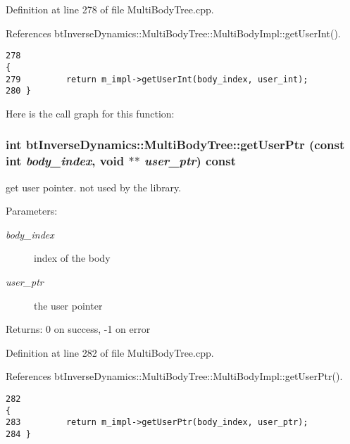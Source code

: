 Definition at line 278 of file MultiBodyTree.cpp.

References btInverseDynamics::MultiBodyTree::MultiBodyImpl::getUserInt().

\begin{Code}\begin{verbatim}278                                                                        {
279         return m_impl->getUserInt(body_index, user_int);
280 }
\end{verbatim}
\end{Code}




Here is the call graph for this function:\hypertarget{classbt_inverse_dynamics_1_1_multi_body_tree_32df6e169921b17d1bce944dc83918e9}{
\subsubsection[getUserPtr]{\setlength{\rightskip}{0pt plus 5cm}int btInverseDynamics::MultiBodyTree::getUserPtr (const int {\em body\_\-index}, \/  void $\ast$$\ast$ {\em user\_\-ptr}) const}}
\label{classbt_inverse_dynamics_1_1_multi_body_tree_32df6e169921b17d1bce944dc83918e9}


get user pointer. not used by the library. \begin{Desc}
\item[Parameters:]
\begin{description}
\item[{\em body\_\-index}]index of the body \item[{\em user\_\-ptr}]the user pointer \end{description}
\end{Desc}
\begin{Desc}
\item[Returns:]0 on success, -1 on error \end{Desc}


Definition at line 282 of file MultiBodyTree.cpp.

References btInverseDynamics::MultiBodyTree::MultiBodyImpl::getUserPtr().

\begin{Code}\begin{verbatim}282                                                                          {
283         return m_impl->getUserPtr(body_index, user_ptr);
284 }
\end{verbatim}
\end{Code}




